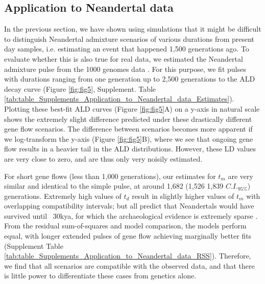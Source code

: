 \documentclass[11pt]{article}
\begin{document}
\subsection{Application to Neandertal data}

In the previous section, we have shown using simulations that it might be difficult to distinguish Neandertal admixture scenarios of various durations from present day samples, i.e. estimating an event that happened 1,500 generations ago. To evaluate whether this is also true for real data, we estimated the Neandertal admixture pulse from the 1000 genomes data \citep{the_1000_genomes_project_consortium_global_2015}. For this purpose,  we fit  pulses with durations ranging from one generation up to 2,500 generations to the ALD decay curve (Figure \ref{fig:fig5}, Supplement. Table \ref{tab:table_Supplements_Application_to_Neandertal_data_Estimates}). Plotting these best-fit ALD curves (Figure \ref{fig:fig5}A) on a y-axis in natural scale shows the extremely slight difference predicted under these drastically different gene flow scenarios. The difference between scenarios becomes more apparent if we log-transform the y-axis (Figure \ref{fig:fig5}B), where we see that ongoing gene flow results in a heavier tail in the ALD distributions. However, these LD values are very close to zero, and are thus only very noisily estimated. 

For short gene flows (less than 1,000 generations), our estimates for $t_m$ are very similar and identical to the simple pulse, at around 1,682 (1,526 1,839 $C.I._{95\%}$) generations. Extremely high values of $t_d$ result in slightly higher values of $t_m$ with overlapping compatibility intervals; but all predict that Neandertals would have survived until ~30kya, for which the archaeological evidence is extremely sparse \citep{hublin_last_2017}.  From the residual sum-of-squares and model comparison, the models perform equal, with longer extended pulses of gene flow achieving marginally better fits (Supplement Table \ref{tab:table_Supplements_Application_to_Neandertal_data_RSS}). Therefore, we find that all scenarios are compatible with the observed data, and that there is little power to differentiate these cases from genetics alone.  
\end{document}
